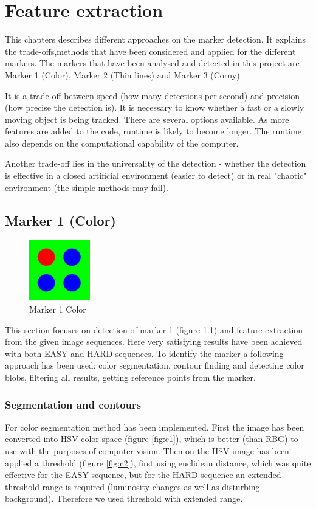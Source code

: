 \chapter{Feature extraction} %
\label{chap:feature_extraction}
This chapters describes different approaches on the marker detection. It explains the trade-offs,methods that have been considered and applied for the different markers. The markers that have been analysed and detected in this project are Marker 1 (Color), Marker 2 (Thin lines) and Marker 3 (Corny). 

It is a trade-off between speed (how many detections per second) and precision (how precise the detection is). It is necessary to know whether a fast or a slowly moving object is being tracked. There are several options available. As more features are added to the code, runtime is likely to become longer. The runtime also depends on the computational capability of the computer.

Another trade-off lies in the universality of the detection - whether the detection is effective in a closed artificial environment (easier to detect) or in real "chaotic" environment (the simple methods may fail).

\newpage




\section{Marker 1 (Color)} 

\begin{figure}[ht!]
	\centering
	\includegraphics[width=100px]{figures/Marker1}
	\caption{Marker 1 Color}
	\label{fig:markerColor}
\end{figure}

This section focuses on detection of marker 1 (figure \ref{fig:markerColor}) and feature extraction from the given image sequences.
Here very satisfying results have been achieved with both EASY and HARD sequences. To identify the marker a following approach has been used: color segmentation, contour finding and detecting color blobs, filtering all results, getting reference points from the marker. 

\subsection{Segmentation and contours}
For color segmentation method has been implemented. First the image has been converted into HSV color space (figure \ref{fig:c1}), which is better (than RBG) to use with the purposes of computer vision. Then on the HSV image has been applied a threshold (figure \ref{fig:c2}), first using euclidean  distance, which was quite effective for the EASY sequence, but for the HARD sequence an extended threshold range is required (luminosity changes as well as disturbing background). Therefore we used threshold with extended range.

